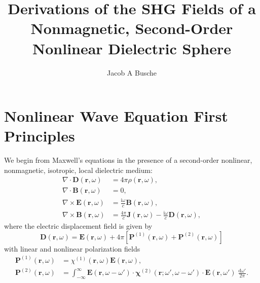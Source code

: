 \documentclass{article}
\begin{document}
\title{Derivations of the SHG Fields of a Nonmagnetic, Second-Order Nonlinear Dielectric Sphere}
\author{Jacob A Busche}
\maketitle

\section{Nonlinear Wave Equation First Principles}\label{sec:nonlinearFirstPrinciplesClassical}

We begin from Maxwell's equations in the presence of a second-order nonlinear, nonmagnetic, isotropic, local dielectric medium:
\begin{equation}
\begin{split}
\nabla\cdot\mathbf{D}(\mathbf{r},\omega) &= 4\pi\rho(\mathbf{r},\omega),\\
\nabla\cdot\mathbf{B}(\mathbf{r},\omega) &= 0,\\
\nabla\times\mathbf{E}(\mathbf{r},\omega) &= \frac{\mathrm{i}\omega}{c}\mathbf{B}(\mathbf{r},\omega),\\
\nabla\times\mathbf{B}(\mathbf{r},\omega) &= \frac{4\pi}{c}\mathbf{J}(\mathbf{r},\omega) - \frac{\mathrm{i}\omega}{c}\mathbf{D}(\mathbf{r},\omega),
\end{split}
\end{equation}
where the electric displacement field is given by
\begin{equation}
\mathbf{D}(\mathbf{r},\omega) = \mathbf{E}(\mathbf{r},\omega) + 4\pi\left[\mathbf{P}^{(1)}(\mathbf{r},\omega) + \mathbf{P}^{(2)}(\mathbf{r},\omega)\right]
\end{equation}
with linear and nonlinear polarization fields
\begin{equation}
\begin{split}
\mathbf{P}^{(1)}(\mathbf{r},\omega) &= \chi^{(1)}(\mathbf{r},\omega)\mathbf{E}(\mathbf{r},\omega),\\
\mathbf{P}^{(2)}(\mathbf{r},\omega) &= \int_{-\infty}^\infty\mathbf{E}(\mathbf{r},\omega - \omega')\cdot\bm{\chi}^{(2)}(\mathbf{r};\omega',\omega - \omega')\cdot\mathbf{E}(\mathbf{r},\omega')\;\frac{\mathrm{d}\omega'}{2\pi}.
\end{split}
\end{equation}
\end{document}
